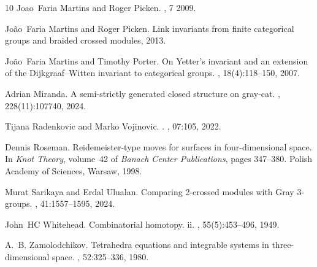 \documentclass[11pt, reqno]{amsart} %
\theoremstyle{definition}
\theoremstyle{remark}
\numberwithin{equation}{section}
\begin{document}
\begin{thebibliography}{10}
Joao~Faria Martins and Roger Picken.
, 7 2009.

Jo{\~a}o~Faria Martins and Roger Picken.
\newblock Link invariants from finite categorical groups and braided crossed modules, 2013.

Jo{\~a}o~Faria Martins and Timothy Porter.
\newblock On {Y}etter's invariant and an extension of the {D}ijkgraaf--{W}itten invariant to categorical groups.
, 18(4):118--150, 2007.

Adrian Miranda.
\newblock A semi-strictly generated closed structure on gray-cat.
, 228(11):107740, 2024.

Tijana Radenkovic and Marko Vojinovic.
.
, 07:105, 2022.

Dennis Roseman.
\newblock Reidemeister-type moves for surfaces in four-dimensional space.
\newblock In {\em Knot Theory}, volume~42 of {\em Banach Center Publications}, pages 347--380. Polish Academy of Sciences, Warsaw, 1998.

Murat Sarikaya and Erdal Ulualan.
\newblock Comparing 2-crossed modules with {Gray} 3-groups.
, 41:1557--1595, 2024.

John~HC Whitehead.
\newblock Combinatorial homotopy. ii.
, 55(5):453--496, 1949.

A.~B. Zamolodchikov.
\newblock Tetrahedra equations and integrable systems in three-dimensional space.
, 52:325--336, 1980.

\end{thebibliography}
\end{document}
